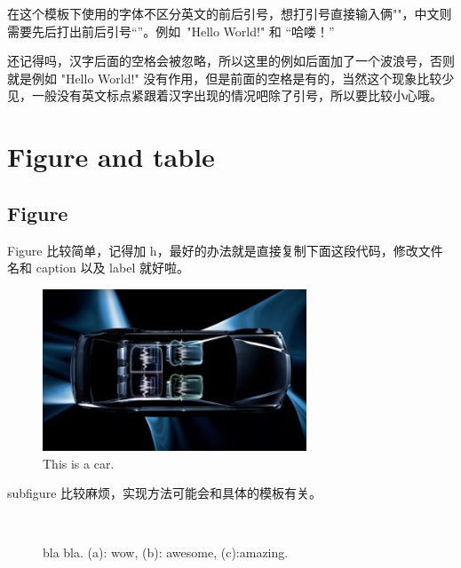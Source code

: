 在这个模板下使用的字体不区分英文的前后引号，想打引号直接输入俩""，中文则需要先后打出前后引号“”。例如~"Hello World!" 和 “哈喽！”

还记得吗，汉字后面的空格会被忽略，所以这里的例如后面加了一个波浪号，否则就是例如 "Hello World!" 没有作用，但是前面的空格是有的，当然这个现象比较少见，一般没有英文标点紧跟着汉字出现的情况吧除了引号，所以要比较小心哦。

\section{Figure and table}

\subsection{Figure}
Figure 比较简单，记得加 h，最好的办法就是直接复制下面这段代码，修改文件名和 caption
以及 label 就好啦。
\\  %
\begin{figure}[h]
    \centering
    \includegraphics[width=0.7\textwidth]{Img/Chap1/fig1a}
    \caption{This is a car.}
    \label{fig:car}
\end{figure}

subfigure 比较麻烦，实现方法可能会和具体的模板有关。
\begin{figure}[h]
    \centering
    ~
    ~
    \caption{bla bla. (a): wow, (b): awesome, (c):amazing.}
    \label{fig:bla bla}
\end{figure}

